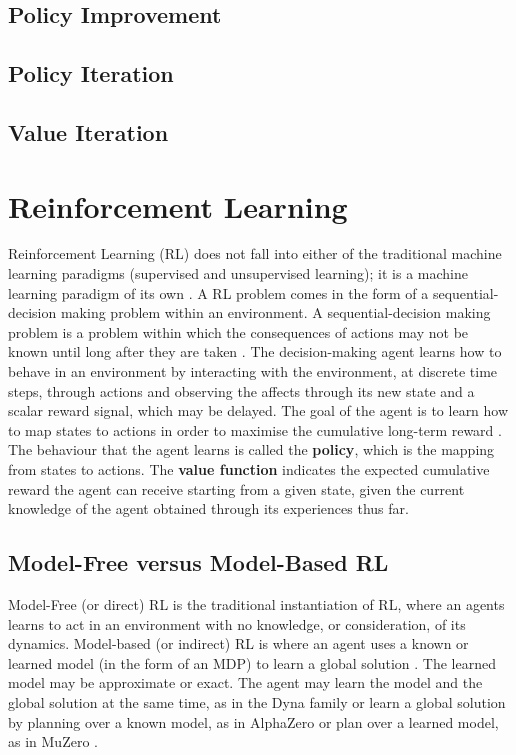 \subsection{Policy Improvement}
\subsection{Policy Iteration}
\cite{Bellman:1957, howard:dp}
\subsection{Value Iteration}
\cite{series/synthesis/2010Szepesvari}
\section{Reinforcement Learning}
Reinforcement Learning (RL) does not fall into either of the traditional machine learning paradigms (supervised and unsupervised learning); it is a machine learning paradigm of its own \cite{DBLP:journals/corr/cs-AI-9605103}.
A RL problem comes in the form of a sequential-decision making problem within an environment. A sequential-decision making problem is a problem within which the consequences of actions may not be known until long after they are taken \cite{barto1990learning}. The decision-making agent learns how to behave in an environment by interacting with the environment, at discrete time steps, through actions and observing the affects through its new state and a scalar reward signal, which may be delayed. The goal of the agent is to learn how to map states to actions in order to maximise the cumulative long-term reward \cite{Sutton1998}. The behaviour that the agent learns is called the \textbf{policy}, which is the mapping from states to actions. The \textbf{value function} indicates the expected cumulative reward the agent can receive starting from a given state, given the current knowledge of the agent obtained through its experiences thus far.

\subsection{Model-Free versus Model-Based RL}
Model-Free (or direct) RL is the traditional instantiation of RL, where an agents learns to act in an environment with no knowledge, or consideration, of its dynamics.
Model-based (or indirect) RL is where an agent uses a known or learned model (in the form of an MDP) to learn a global solution \cite{MAL-086}. The learned model may be approximate or exact. The agent may learn the model and the global solution at the same time, as in the Dyna family \cite{Sutton:1990, 10.1145/122344.122377} or learn a global solution by planning over a known model, as in AlphaZero \cite{DBLP:journals/corr/abs-1712-01815} or plan over a learned model, as in MuZero \cite{DBLP:journals/corr/abs-1911-08265}.

